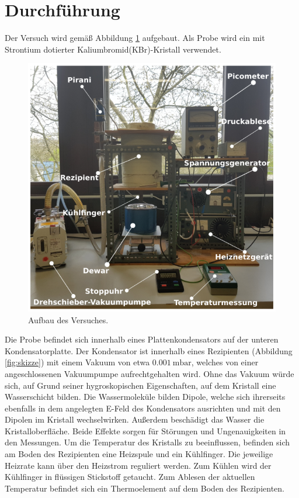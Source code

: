 \section{Durchführung}
\label{sec:Durchführung}

Der Versuch wird gemäß Abbildung \ref{fig:aufbau} aufgebaut. Als Probe wird ein mit Strontium dotierter Kaliumbromid(KBr)-Kristall verwendet.

\begin{figure}
    \centering
    \includegraphics[width=\textwidth]{Bilder/Aufbau.PNG}
    \caption{Aufbau des Versuches.\cite{V48}}
    \label{fig:aufbau}
\end{figure}

Die Probe befindet sich innerhalb eines Plattenkondensators auf der unteren Kondensatorplatte. Der Kondensator ist innerhalb eines Rezipienten (Abbildung \ref{fig:skizze}) mit einem Vakuum von etwa $\SI{0.001}{\milli\bar}$, welches von einer angeschlossenen Vakuumpumpe aufrechtgehalten wird. Ohne das Vakuum würde sich, auf Grund seiner hygroskopischen Eigenschaften, auf dem Kristall eine Wasserschicht bilden. Die Wassermoleküle bilden Dipole, welche sich ihrerseits ebenfalls in dem angelegten E-Feld des Kondensators ausrichten und mit den Dipolen im Kristall wechselwirken. Außerdem beschädigt das Wasser die Kristalloberfläche. Beide Effekte sorgen für Störungen und Ungenauigkeiten in den Messungen.
Um die Temperatur des Kristalls zu beeinflussen, befinden sich am Boden des Rezipienten eine Heizspule und ein Kühlfinger. Die jeweilige Heizrate kann über den Heizstrom reguliert werden. Zum Kühlen wird der Kühlfinger in flüssigen Stickstoff getaucht. Zum Ablesen der aktuellen Temperatur befindet sich ein Thermoelement auf dem Boden des Rezipienten. 


